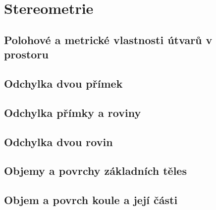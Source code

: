 
\newpage
    \section{Stereometrie}
        \subsection{Polohové a metrické vlastnosti útvarů v prostoru}
        \subsection{Odchylka dvou přímek}
        \subsection{Odchylka přímky a roviny}
        \subsection{Odchylka dvou rovin}
        \subsection{Objemy a povrchy základních těles}
        \subsection{Objem a povrch koule a její části}